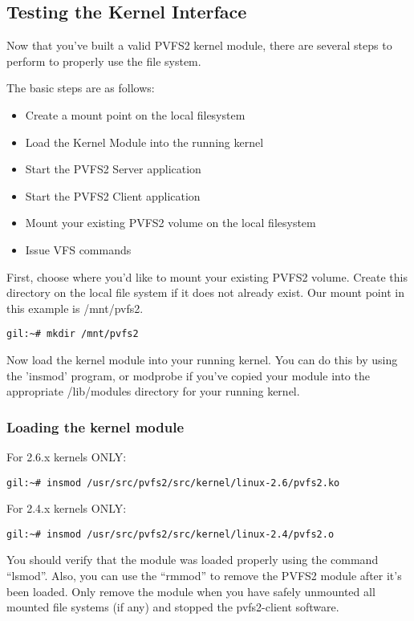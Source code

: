 \documentclass[11pt, letterpaper]{article}
\begin{document}
\subsection{Testing the Kernel Interface}
\label{sec:vfs-test}

Now that you've built a valid PVFS2 kernel module, there are several
steps to perform to properly use the file system.

The basic steps are as follows:
\begin{itemize}
\item Create a mount point on the local filesystem
\item Load the Kernel Module into the running kernel
\item Start the PVFS2 Server application
\item Start the PVFS2 Client application
\item Mount your existing PVFS2 volume on the local filesystem
\item Issue VFS commands
\end{itemize}

First, choose where you'd like to mount your existing PVFS2 volume.
Create this directory on the local file system if it does not already
exist.  Our mount point in this example is /mnt/pvfs2.

\begin{verbatim}
gil:~# mkdir /mnt/pvfs2
\end{verbatim}

Now load the kernel module into your running kernel.  You can do this
by using the 'insmod' program, or modprobe if you've copied your
module into the appropriate /lib/modules directory for your running
kernel.

\subsubsection{Loading the kernel module}
For 2.6.x kernels ONLY:
\begin{verbatim}
gil:~# insmod /usr/src/pvfs2/src/kernel/linux-2.6/pvfs2.ko
\end{verbatim}

For 2.4.x kernels ONLY:
\begin{verbatim}
gil:~# insmod /usr/src/pvfs2/src/kernel/linux-2.4/pvfs2.o
\end{verbatim}

You should verify that the module was loaded properly using the
command ``lsmod''.  Also, you can use the ``rmmod'' to remove the
PVFS2 module after it's been loaded.  Only remove the module when you
have safely unmounted all mounted file systems (if any) and stopped
the pvfs2-client software.
\end{document}
